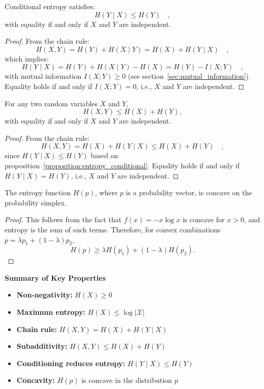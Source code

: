 \documentclass[../../main.tex]{subfiles}
\begin{document}
\begin{proposition}
    \label{proposition:entropy_conditional}
    Conditional entropy satisfies:
    \[
        H(Y \mid X) \leq H(Y) \quad ,
    \]
    with equality if and only if \( X \) and \( Y \) are independent.
\end{proposition}
\vspace{-2.5em}
\begin{proof}
    From the chain rule:
    \[
        H(X, Y) = H(Y) + H(X \mid Y) = H(X) + H(Y \mid X) \quad ,
    \]
    which implies:
    \[
        H(Y \mid X) = H(Y) + H(X \mid Y) - H(X) = H(Y) - I(X; Y) \quad ,
    \]
    with mutual information \( I(X; Y) \geq 0 \) (see section~\ref{sec:mutual_information}). Equality holds if and only if \( I(X; Y) = 0 \), i.e., \( X \) and \( Y \) are independent.
\end{proof}

\medskip
\begin{corollary}
    For any two random variables \( X \) and \( Y \),
    \[
        H(X, Y) \leq H(X) + H(Y),
    \]
    with equality if and only if \( X \) and \( Y \) are independent.
\end{corollary}
\vspace{-2.5em}
\begin{proof}
    From the chain rule:
    \[
        H(X, Y) = H(X) + H(Y \mid X) \leq H(X) + H(Y) \quad ,
    \]
    since \( H(Y \mid X) \leq H(Y) \) based on proposition~\ref{proposition:entropy_conditional}. Equality holds if and only if \( H(Y \mid X) = H(Y) \), i.e., \( X \) and \( Y \) are independent.
\end{proof}

\medskip
\begin{theorem}
The entropy function \( H(p) \), where \( p \) is a probability vector, is concave on the probability simplex.
\end{theorem}

\begin{proof}
This follows from the fact that \( f(x) = -x \log x \) is concave for \( x > 0 \), and entropy is the sum of such terms. Therefore, for convex combinations \( p = \lambda p_1 + (1 - \lambda)p_2 \),
\[
H(p) \geq \lambda H(p_1) + (1 - \lambda) H(p_2).
\]
\end{proof}

\textbf{Summary of Key Properties}

\begin{itemize}[leftmargin=1.2cm]
    \item \textbf{Non-negativity:} \( H(X) \geq 0 \)
    \item \textbf{Maximum entropy:} \( H(X) \leq \log |\mathcal{X}| \)
    \item \textbf{Chain rule:} \( H(X, Y) = H(X) + H(Y \mid X) \)
    \item \textbf{Subadditivity:} \( H(X, Y) \leq H(X) + H(Y) \)
    \item \textbf{Conditioning reduces entropy:} \( H(Y \mid X) \leq H(Y) \)
    \item \textbf{Concavity:} \( H(p) \) is concave in the distribution \( p \)
\end{itemize}
\end{document}
